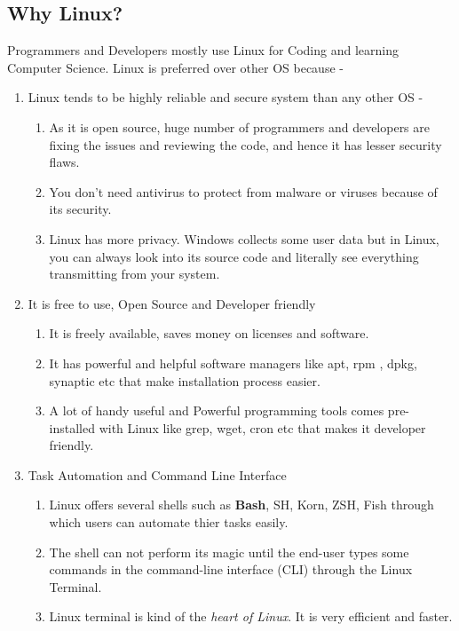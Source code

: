 \documentclass[12pt]{article}
\begin{document}
\subsection{Why Linux?}
Programmers and Developers mostly use Linux\cite{whyLinux:3} for Coding and learning Computer Science. Linux\cite{whyLinux:2} is preferred over other OS because -
\begin{enumerate}
    \item Linux tends to be highly reliable and secure system than any other OS -
    \begin{enumerate}[label=(\roman*)]
        \item As it is open source, huge number of programmers and developers are fixing the issues and reviewing the code, and hence it has lesser security flaws.
        \item You don't need antivirus to protect from malware or viruses because of its security.
        \item Linux has more privacy. Windows collects some user data but in Linux, you can always look into its source code and literally see everything transmitting from your system.
    \end{enumerate}
    \item It is free to use, Open Source and Developer friendly
    \begin{enumerate}[label=(\roman*)]
        \item It is freely available, saves money on licenses and software.
        \item It has powerful and helpful software managers like apt, rpm , dpkg, synaptic etc that make installation process easier.
        \item A lot of handy useful and Powerful programming tools comes pre-installed with Linux like grep, wget, cron etc that makes it developer friendly.
    \end{enumerate}
    \item Task Automation and Command Line Interface
    \begin{enumerate}[label=(\roman*)]
        \item Linux offers several shells such as \textbf{Bash}, SH, Korn, ZSH, Fish through which users can automate thier tasks easily.
        \item The shell can not perform its magic until the end-user types some commands in the command-line interface (CLI) through the Linux Terminal.
        \item Linux terminal is kind of the \textit{heart of Linux}. It is very efficient and faster.
    \end{enumerate}
\end{enumerate}
\end{document}
